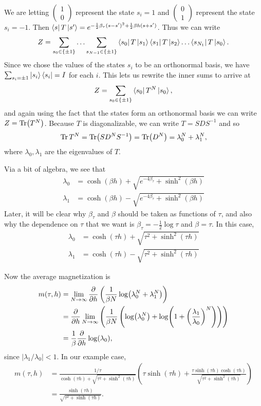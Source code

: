 \documentclass[10pt,reqno]{amsart}
\numberwithin{equation}{section}
\begin{document}
	We are letting $\begin{pmatrix}
	1 \\ 0 
	\end{pmatrix}$ represent the state $s_i=1$ and $\begin{pmatrix}
	0 \\ 1
	\end{pmatrix}$ represent the state $s_i=-1$. 
	Then $\bra{s}T\ket{s'}= e^{-\frac{1}{2}\beta_\tau(s-s')^2+\frac{1}{2}\beta h (s+s')}$.
	Thus we can write 
		\[Z=\sum_{s_0 \in \{\pm 1\}} \ldots \sum_{s_{N-1}\in \{\pm 1\}} \bra{s_0}T\ket{s_1}\bra{s_1}T\ket{s_2}\ldots\bra{s_{N_1}}T\ket{s_0}. \]
	Since we chose the values of the states $s_i$ to be an orthonormal basis, we have $\sum_{s_i=\pm 1} \ket{s_i}\bra{s_i}=I$ for each $i$.
	This lets us rewrite the inner sums to arrive at 
		 \[ Z=\sum_{s_0 \in \{\pm 1\}} \bra{s_0}T^N \ket{s_0}, \]
	and again using the fact that the states form an orthonormal basis we can write $Z=\Tr (T^N)$.
	Because $T$ is diagonalizable, we can write $T=SDS^{-1}$ and so 
		\[\Tr T^N=\Tr(SD^NS^{-1})=\Tr(D^N)=\lambda_0^N+\lambda_1^N,\]
	where $\lambda_0,\lambda_1$ are the eigenvalues of $T$.
	
	Via a bit of algebra, we see that 
	\begin{align*}
		\lambda_0 &=\cosh(\beta h)+ \sqrt{e^{-4\beta_\tau} +\sinh^2(\beta h) } \\
		\lambda_1 &=\cosh(\beta h)- \sqrt{e^{-4\beta_\tau} +\sinh^2(\beta h) }
	\end{align*} 
	Later, it will be clear why $\beta_\tau$ and $\beta$ should be taken as functions of $\tau$, and
	also why the dependence on $\tau$ that we want is $\beta_\tau=-\frac{1}{2}\log \tau$ and $\beta = \tau$.
	In this case,
	\begin{align*}
		\lambda_0 &=\cosh(\tau h)+ \sqrt{\tau^2 +\sinh^2(\tau h)} \\
		\lambda_1 &=\cosh(\tau h)- \sqrt{\tau^2 +\sinh^2(\tau h)}
	\end{align*}
	
	Now the average magnetization is
	\begin{align*}
		m(\tau, h)&=\lim_{N\to \infty}\frac{\partial}{\partial h}\left( \frac{1}{\beta N}\log(\lambda_0^N+\lambda_1^N) \right) \\
			&=\frac{\partial}{\partial h}\lim_{N\to \infty}\left( \frac{1}{\beta N}\left(\log(\lambda_0^N)+\log(1+\left(\frac{\lambda_1}{\lambda_0}\right)^N)\right) \right) \\
			&= \frac{1}{\beta}\frac{\partial}{\partial h} \log(\lambda_0),
	\end{align*}
	since $|\lambda_1/\lambda_0| <1.$
	In our example case,
	\begin{align*}
		m(\tau,h)&= \frac{1/\tau}{\cosh(\tau h)+ \sqrt{\tau^2 +\sinh^2(\tau h)}}\left( \tau \sinh(\tau h)+\frac{\tau \sinh(\tau h)\cosh(\tau h)}{\sqrt{\tau^2 +\sinh^2(\tau h)}} \right)\\
		&=\frac{\sinh(\tau h)}{\sqrt{\tau^2+\sinh(\tau h)}}.
	\end{align*}
\end{document}
